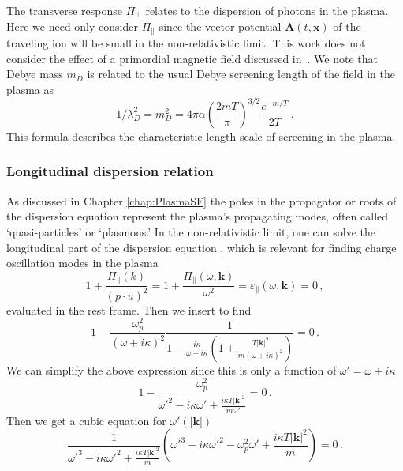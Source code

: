The transverse response $\Pi_{\perp}$ relates to the dispersion of photons in the plasma. Here we need only consider $\Pi_\parallel$ since the vector potential $\boldsymbol{A}(t,\boldsymbol{x})$ of the traveling ion will be small in the non-relativistic limit. This work does not consider the effect of a primordial magnetic field discussed in~\cite{Steinmetz:2023abc}. We note that Debye mass $m_D$ is related to the usual Debye screening length of the field in the plasma as
\begin{equation}\label{eq:mL}
	1/\lambda_D^{2} = m_D^2= 4 \pi \alpha \left(\frac{2mT}{\pi}\right)^{3/2}\frac{e^{-m/T}}{2T}\,.
\end{equation}
This formula describes the characteristic length scale of screening in the plasma.

\subsubsection{Longitudinal dispersion relation}
As discussed in Chapter \ref{chap:PlasmaSF} the poles in the propagator or roots of the dispersion equation represent the plasma's propagating modes, often called `quasi-particles' or `plasmons.' In the non-relativistic limit, one can solve the longitudinal part of the dispersion equation , which is relevant for finding charge oscillation modes in the plasma
\begin{equation}
    1+ \frac{\Pi_\parallel( k)}{(p\cdot u)^2}= 1+ \frac{\Pi_\parallel(\omega, \boldsymbol{k})}{\omega^2}=\varepsilon_\parallel(\omega,\boldsymbol{k}) =0 \,,
\end{equation}
evaluated in the rest frame. Then we insert  to find
\begin{equation}
   1- \frac{\omega_p^2}{(\omega+ i \kappa)^2} \frac{1}{1-\frac{i\kappa}{\omega+ i \kappa}\left(1+\frac{T |\boldsymbol{k}|^2}{m(\omega+ i \kappa)^2} \right)}=0 \,.
\end{equation}
We can simplify the above expression since this is only a function of $\omega' =\omega+i\kappa$
\begin{equation}
   1- \frac{\omega_p^2}{\omega'^2-i\kappa\omega'+\frac{i\kappa T |\boldsymbol{k}|^2}{m \omega'} }=0 \,.
\end{equation}
Then we get a cubic equation for $\omega'(|\boldsymbol{k}|)$
\begin{equation}\label{eq:dispfact}
   \frac{1}{\omega'^3-i\kappa\omega'^2+\frac{i\kappa T |\boldsymbol{k}|^2}{m} }
    \left(\omega'^3-i\kappa\omega'^2 - \omega_p^2\omega'+\frac{i\kappa T |\boldsymbol{k}|^2}{m} \right)=0 \,.
\end{equation}
